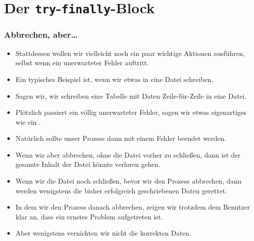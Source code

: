 \documentclass[aspectratio=169,mathserif,notheorems]{beamer}%
\begin{document}
\section{Der \texttt{try}-\texttt{finally}-Block}%
%
\begin{frame}[t]%
\frametitle{Abbrechen, aber\dots}%
\begin{itemize}%
%
%
%
%
%
%
%
%
%
%
%
%
%
\item<7-> Stattdessen wollen wir vielleicht noch ein paar wichtige Aktionen ausführen, selbst wenn ein unerwarteter Fehler auftritt.%
%
\item<8-> Ein typisches Beispiel ist, wenn wir etwas in eine Datei schreiben.%
%
\item<9-> Sagen wir, wir schreiben eine Tabelle mit Daten Zeile-für-Zeile in eine Datei.%
%
\item<10-> Plötzlich passiert ein völlig unerwarteter Fehler, sagen wir etwas eigenartiges wie ein .%
%
\item<11-> Natürlich sollte unser Prozess dann mit einem Fehler beendet werden.%
%
\item<12-> Wenn wir aber abbrechen, ohne die Datei vorher zu schließen, dann ist der gesamte Inhalt der Datei könnte verloren gehen.%
%
\item<13-> Wenn wir die Datei noch schließen, bevor wir den Prozess abbrechen, dann werden wenigstens die bisher erfolgreich geschriebenen Daten gerettet.%
%
\item<14-> In dem wir den Prozess danach abbrechen, zeigen wir trotzdem dem Benutzer klar an, dass ein ernstes Problem aufgetreten ist.%
%
\item<15-> Aber wenigstens vernichten wir nicht die korrekten Daten.%
%
\end{itemize}%
\end{frame}%
\end{document}
